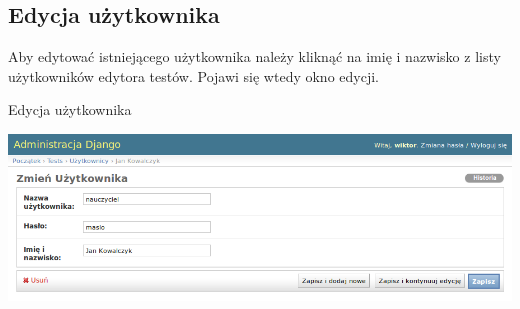 \documentclass[letterpaper,10pt,polish]{sphinxmanual}
\begin{document}
\subsection{Edycja użytkownika}
\label{index:edycja-uzytkownika}
Aby edytować istniejącego użytkownika należy kliknąć na imię i nazwisko z listy użytkowników edytora testów. Pojawi się wtedy okno edycji.

Edycja użytkownika

\includegraphics{EdycjaUzytkownika.png}



\renewcommand{\indexname}{Indeks}
\printindex
\end{document}
